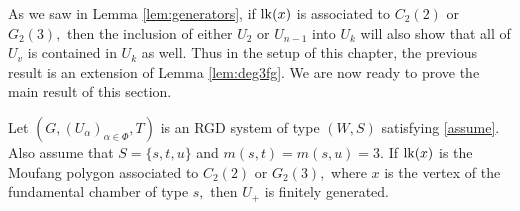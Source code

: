 \documentclass[class=book, crop=false]{standalone}
\begin{document}
As we saw in Lemma \ref{lem:generators}, if $\mathrm{lk}(x)$ is associated to $C_2(2)$ or $G_2(3),$ then the inclusion of either $U_2$ or $U_{n-1}$ into $U_k$ will also show that all of $U_v$ is contained in $U_k$ as well. Thus in the setup of this chapter, the previous result is an extension of Lemma \ref{lem:deg3fg}. We are now ready to prove the main result of this section.

\begin{theorem}
	\label{thm:334fg}
	Let $(G,(U_\alpha)_{\alpha\in \Phi},T)$ is an RGD system of type $(W,S)$ satisfying \eqref{assume}. Also assume that $S=\{s,t,u\}$ and $m(s,t)=m(s,u)=3.$ If $\mathrm{lk}(x)$ is the Moufang polygon associated to $C_2(2)$ or $G_2(3),$ where $x$ is the vertex of the fundamental chamber of type $s,$ then $U_+$ is finitely generated.
\end{theorem}
\end{document}

